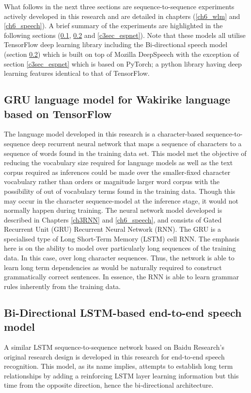 What follows in the next three sections are sequence-to-sequence experiments actively developed in this research and are detailed in chapters (\ref{ch6_wlm} and \ref{ch6_speech}).  A brief summary of the experiments are highlighted in the following sections (\ref{sec_grulm}, \ref{sec_be2e} and \ref{c3sec_espnet}).  Note that these models all utilise TensorFlow deep learning library including the Bi-directional speech model (section \ref{sec_be2e}) which is built on top of Mozilla DeepSpeech with the exception of section \ref{c3sec_espnet} which is based on PyTorch; a  python library having deep learning features identical  to that of TensorFlow.

\subsection{GRU language model for Wakirike language based on TensorFlow}\label{sec_grulm}
The language model developed in this research is a character-based sequence-to-sequence deep recurrent neural network that maps a sequence of characters to a sequence of words found in the training data set. This model met the objective of reducing the vocabulary size required for language models as well as the text corpus required as inferences could be made over the smaller-fixed character vocabulary rather than orders or magnitude larger word corpus with the possibility of out of vocabulary terms found in the training data.  Though this may occur in the character sequence-model at the inference stage, it would not normally happen during training.  The neural network model developed is described in Chapters \ref{ch3RNN} and \ref{ch6_speech}, and consists of Gated Recurrent Unit (GRU) Recurrent Neural Network (RNN). The GRU is a specialised type of Long Short-Term Memory (LSTM) cell RNN.  The emphasis here is on the ability to model over particularly long sequences of the training data.  In this case, over long character sequences.  Thus, the network is able to learn long term dependencies as would be naturally required to construct grammatically correct sentences.  In essence, the RNN is able to learn grammar rules inherently from the training data.

\subsection{Bi-Directional LSTM-based end-to-end speech model}\label{sec_be2e}
A similar LSTM sequence-to-sequence network based on Baidu Research’s original research design \citep{hannun2014deep} is developed in this research for end-to-end speech recognition.  This model, as its name implies, attempts to establish long term relationships by adding a reinforcing LSTM layer learning information but this time from the opposite direction, hence the bi-directional architecture.  

